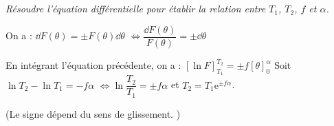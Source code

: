 \begin{multicols}{2}
\begin{multicols}{2}
\begin{corrige}
%
%
%
%
%
%
%
%

\end{corrige}
\else
\fi

\subparagraph{}\textit{Résoudre l'équation différentielle pour établir la relation entre $T_1$, $T_2$, $f$ et $\alpha$.}
\ifprof
\begin{corrige}
On a :
 $ \dd F(\theta)= \pm  F\left(\theta\right) \dd \theta $
  $ \Leftrightarrow \dfrac{ \dd F(\theta)}{ F\left(\theta\right)}= \pm \dd \theta $
  
  En intégrant l'équation précédente, on a :
  $\left[ \ln F \right] _{T_1}^{T_2} =\pm f \left[ \theta \right] _{0}^{\alpha}$
  Soit $\ln T_2 - \ln T_1 = -f\alpha$ $\Leftrightarrow \ln \dfrac{T_2}{T_1} = \pm f\alpha$ et $T_2 = T_1 \text{e}^{\pm f\alpha}$.
  
(Le signe dépend du sens de glissement. )
\end{corrige}
\else
\fi

\ifprof
\end{multicols}
\else
\end{multicols}
\fi
